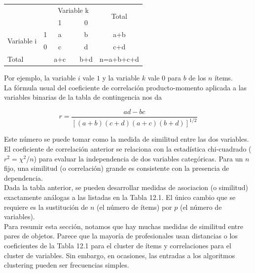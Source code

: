 \documentclass[a4paper, 20pt]{article}
\begin{document}
\begin{table}[h]
\centering
\resizebox{7.5cm}{!} {
\begin{tabular}{ll|clc|c|l}
\multicolumn{2}{l|}{\multirow{2}{*}{}} & \multicolumn{3}{c}{Variable k} & \multicolumn{2}{c|}{\multirow{2}{*}{Total}} \\
\multicolumn{2}{l|}{}                  & 1        &       & 0       & \multicolumn{2}{c|}{}                        \\ \hline
\multirow{2}{*}{Variable i}       & 1      & a        &       & b       & \multicolumn{2}{c|}{a+b}                     \\
                              & 0      & c        &       & d       & \multicolumn{2}{c|}{c+d}                     \\ \hline
\multicolumn{2}{l|}{Total}            & a+c      &       & b+d     & \multicolumn{2}{c|}{n=a+b+c+d}              
\end{tabular}
}
\end{table}

Por ejemplo, la variable $i$ vale $1$ y la variable $k$ vale $0$ para $b$ de los $n$ ítems.\\
La fórmula usual del coeficiente de correlación producto-momento aplicada a las variables binarias de la tabla de contingencia nos da

$$r = \frac{ad-bc}{[(a+b)(c+d)(a+c)(b+d)]^{1/2}}$$

Este número se puede tomar como la medida de similitud entre las dos variables.\\
El coeficiente de correlación anterior se relaciona con la estadística chi-cuadrado ($r^2=\chi^2/n$) para evaluar la independencia de dos variables categóricas. Para un $n$ fijo, una similitud (o correlación) grande es consistente con la presencia de dependencia.\\

Dada la tabla anterior, se pueden desarrollar medidas de asociacion (o similitud) exactamente análogas a las listadas en la Tabla 12.1. El único cambio que se requiere es la sustitución de $n$ (el número de ítems) por $p$ (el número de variables).\\

Para resumir esta sección, notamos que hay muchas medidas de similitud entre pares de objetos. Parece que la mayoría de profesionales usan distancias o los coeficientes de la Tabla 12.1 para el cluster de ítems y correlaciones para el cluster de variables. Sin embargo, en ocasiones, las entradas a los algoritmos clustering pueden ser frecuencias simples.\\
\end{document}
